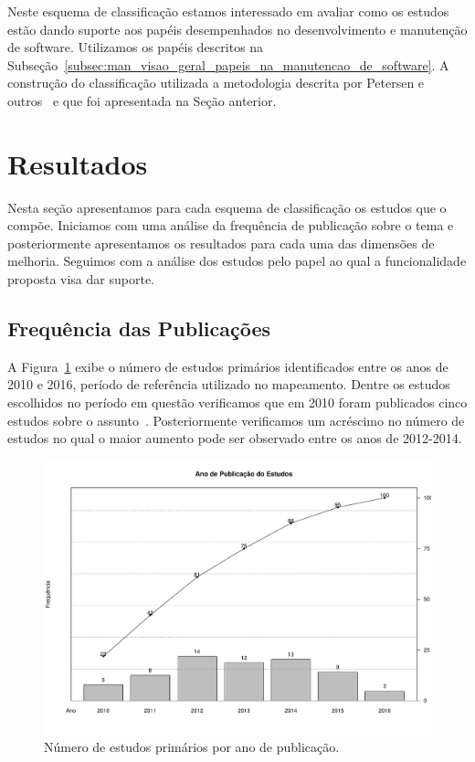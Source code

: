 Neste esquema de classificação estamos interessado em avaliar como os estudos
estão dando suporte aos papéis desempenhados no desenvolvimento e manutenção de
software.  Utilizamos os papéis descritos na
Subseção~\ref{subsec:man_visao_geral_papeis_na_manutencao_de_software}. A
construção do classificação utilizada a metodologia descrita por Petersen e
outros~\cite{Petersen2008} e que foi apresentada na Seção anterior.

\section{Resultados}
\label{sec:mapeamento_resultados}

Nesta seção apresentamos para cada esquema de classificação os estudos que o
compõe. Iniciamos com uma análise da frequência de publicação sobre o tema e
posteriormente apresentamos os resultados para cada uma das dimensões de
melhoria. Seguimos com a análise dos estudos pelo papel ao qual a funcionalidade
proposta visa dar suporte.

\subsection{Frequência das Publicações}
\label{sub:frequencia_publicacao}

A Figura~\ref{fig:publicacao_por_ano} exibe o número de estudos primários
identificados entre os anos de 2010 e 2016, período de referência utilizado no
mapeamento. Dentre os estudos escolhidos no período em questão verificamos que
em 2010 foram publicados cinco estudos sobre o
assunto~\cite{sun2010discriminative,gegick2010identifying,song2010jdf,nagwani2010predictive,zimmermann2010makes}.
Posteriormente verificamos um acréscimo no número de estudos no qual o maior
aumento pode ser observado entre os anos de 2012\@-\@2014.

\begin{figure}[htpb] \centering
	\includegraphics[width=0.7\linewidth]{chapter-mapeamento-sistematico/img/ano-publicao-estudos.pdf}
	\caption{Número de estudos primários por ano de publicação.}
	\label{fig:publicacao_por_ano} \end{figure}

